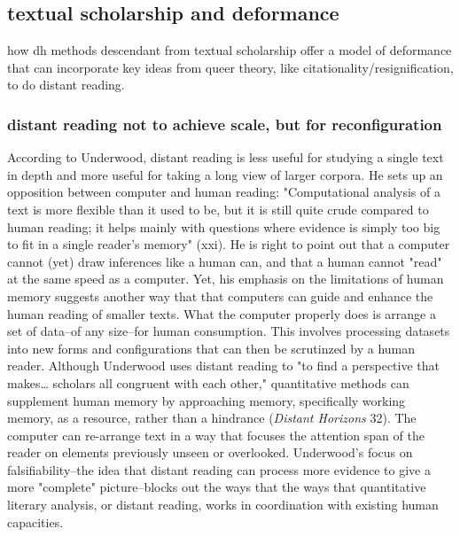 \documentclass[11pt]{article}
\begin{document}
\subsection{textual scholarship and deformance}
\label{sec:orgc9e4901}
how dh methods descendant from textual scholarship offer a model of
deformance that can incorporate key ideas from queer theory, like
citationality/resignification, to do distant reading.
\subsubsection{distant reading not to achieve scale, but for reconfiguration}
\label{sec:org76065a6}
According to Underwood, distant reading is less useful for studying a
single text in depth and more useful for taking a long view of larger
corpora. He sets up an opposition between computer and human reading:
"Computational analysis of a text is more flexible than it used to be,
but it is still quite crude compared to human reading; it helps mainly
with questions where evidence is simply too big to fit in a single
reader's memory" (xxi). He is right to point out that a computer
cannot (yet) draw inferences like a human can, and that a human cannot
"read" at the same speed as a computer. Yet, his emphasis on the
limitations of human memory suggests another way that that computers
can guide and enhance the human reading of smaller texts. What the
computer properly does is arrange a set of data--of any size--for
human consumption. This involves processing datasets into new forms
and configurations that can then be scrutinzed by a human
reader. Although Underwood uses distant reading to "to find a
perspective that makes\ldots{} scholars all congruent with each other,"
quantitative methods can supplement human memory by approaching
memory, specifically working memory, as a resource, rather than a
hindrance (\emph{Distant Horizons} 32). The computer can re-arrange text in
a way that focuses the attention span of the reader on elements
previously unseen or overlooked. Underwood's focus on
falsifiability--the idea that distant reading can process more
evidence to give a more "complete" picture--blocks out the ways that
the ways that quantitative literary analysis, or distant reading,
works in coordination with existing human capacities.
\end{document}
